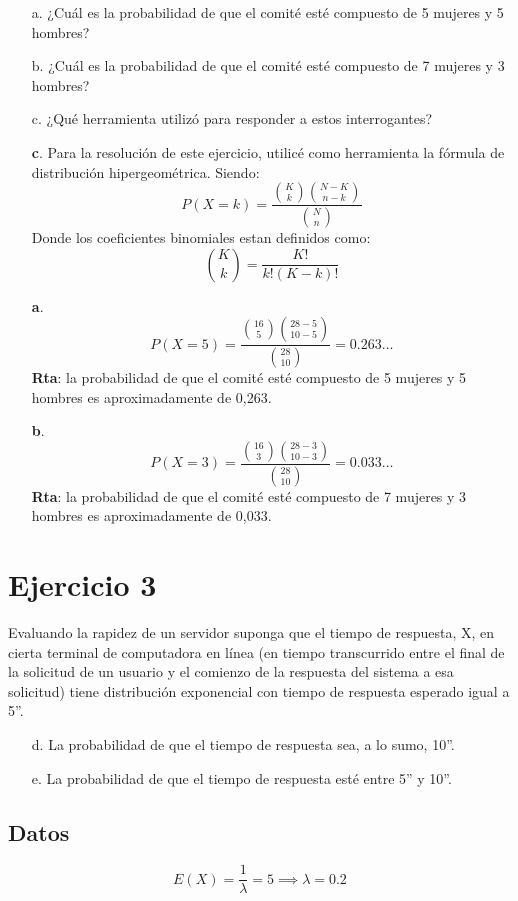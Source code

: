 \documentclass{article}
\begin{document}
\begin{enumerate}
  \item[a.] ¿Cuál es la probabilidad de que el comité esté compuesto de
    5 mujeres y 5 hombres?
  \item[b.] ¿Cuál es la probabilidad de que el comité esté compuesto de
    7 mujeres y 3 hombres?
  \item[c.] ¿Qué herramienta utilizó para responder a estos interrogantes?

  \item[\textbf{c}.] Para la resolución de este ejercicio, utilicé como
    herramienta la fórmula de distribución hipergeométrica. Siendo:
    \[ P(X = k) = \frac{\binom{K}{k} \binom{N - K}{n - k}}{\binom{N}{n}} \]
    Donde los coeficientes binomiales estan definidos como:
    \[ \binom{K}{k} = \frac{K!}{k! (K - k)!} \]
  \item[\textbf{a}.] \[
      P(X = 5) =
      \frac{\binom{16}{5} \binom{28 - 5}{10 - 5}}{\binom{28}{10}} = 0.263 \ldots
    \]
    \textbf{Rta}: la probabilidad de que el comité esté compuesto de 5 mujeres y
    5 hombres es aproximadamente de 0,263.
  \item[\textbf{b}.] \[
      P(X = 3) =
      \frac{\binom{16}{3} \binom{28 - 3}{10 - 3}}{\binom{28}{10}} = 0.033 \ldots
    \]
    \textbf{Rta}: la probabilidad de que el comité esté compuesto de 7 mujeres y
    3 hombres es aproximadamente de 0,033.
\end{enumerate}

\newpage
\section{Ejercicio 3}
Evaluando la rapidez de un servidor suponga que el tiempo de respuesta, X, en
cierta terminal de computadora en línea (en tiempo transcurrido entre el final
de la solicitud de un usuario y el comienzo de la respuesta del sistema a esa
solicitud) tiene distribución exponencial con tiempo de respuesta esperado igual
a 5''.

\begin{enumerate}
  \item[d.] La probabilidad de que el tiempo de respuesta sea, a lo sumo, 10''.
  \item[e.] La probabilidad de que el tiempo de respuesta esté entre 5'' y 10''.
\end{enumerate}

\subsection*{Datos}
\[ E(X) = \frac{1}{\lambda} = 5 \implies \lambda = 0.2 \]
\end{document}
